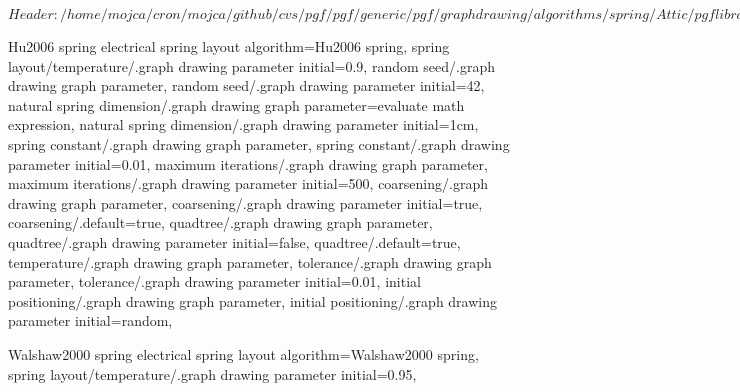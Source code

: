 %
%
%

\ProvidesFileRCS[v\pgfversion] $Header: /home/mojca/cron/mojca/github/cvs/pgf/pgf/generic/pgf/graphdrawing/algorithms/spring/Attic/pgflibrarygraphdrawing.spring.code.tex,v 1.5 2011/05/10 16:31:31 jannis-pohlmann Exp $





%
% 







%
%



%
% 
%
\pgfgddeclarealgorithmkey
  {Hu2006 spring electrical}
  {spring layout}
  {
    algorithm=Hu2006 spring,
    spring layout/temperature/.graph drawing parameter initial=0.9,
  }
  {
    random seed/.graph drawing graph parameter,
    random seed/.graph drawing parameter initial=42,
    natural spring dimension/.graph drawing graph parameter=evaluate math expression,
    natural spring dimension/.graph drawing parameter initial=1cm,
    spring constant/.graph drawing graph parameter,
    spring constant/.graph drawing parameter initial=0.01,
    maximum iterations/.graph drawing graph parameter,
    maximum iterations/.graph drawing parameter initial=500,
    coarsening/.graph drawing graph parameter,
    coarsening/.graph drawing parameter initial=true,
    coarsening/.default=true,
    quadtree/.graph drawing graph parameter,
    quadtree/.graph drawing parameter initial=false,
    quadtree/.default=true,
    temperature/.graph drawing graph parameter,
    tolerance/.graph drawing graph parameter,
    tolerance/.graph drawing parameter initial=0.01,
    initial positioning/.graph drawing graph parameter,
    initial positioning/.graph drawing parameter initial=random,
  }



%
%
%
\pgfgddeclarealgorithmkey
  {Walshaw2000 spring electrical}
  {spring layout}
  {
    algorithm=Walshaw2000 spring,
    spring layout/temperature/.graph drawing parameter initial=0.95,
  }
  {}
